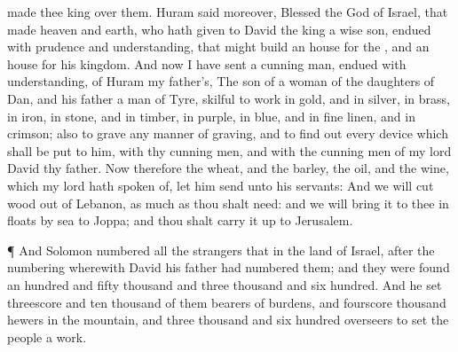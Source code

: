 {made thee
king over them.
Huram
said moreover,
Blessed
{} the
{}
God of
Israel, that
made
heaven and
earth, who hath
given to
David the
king a
wise
son,
endued with
prudence and
understanding, that might
build an
house for the
{}, and an
house for his
kingdom.
And now I have
sent a
cunning
man,
endued with
understanding, of
Huram my
father’s,
The
son of a
woman of the
daughters of
Dan, and his
father
{} a
man of
Tyre,
skilful to
work in
gold, and in
silver, in
brass, in
iron, in
stone, and in
timber, in
purple, in
blue, and in fine
linen, and in
crimson; also to
grave any manner of
graving, and to find
out every
device which shall be
put to him, with thy cunning
men, and with the cunning
men of my
lord
David thy
father.
Now therefore the
wheat, and the
barley, the
oil, and the
wine, which my
lord hath
spoken of, let him
send unto his
servants:
And we will
cut
wood out of
Lebanon, as much as thou shalt
need: and we will
bring it to thee in
floats by
sea to
Joppa; and thou shalt carry it
up to
Jerusalem.
\par }{\PP {}¶ And
Solomon
numbered all the
strangers that
{} in the
land of
Israel,
after the
numbering wherewith
David his
father had
numbered them; and they were
found an
hundred and
fifty
thousand and
three
thousand and
six
hundred.
And he
set threescore and
ten
thousand of them
{} bearers of
burdens, and
fourscore
thousand
{}
hewers in the
mountain, and
three
thousand and
six
hundred
overseers to
set the
people a
work.

}
